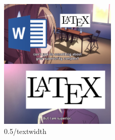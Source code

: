 \documentclass[12pt]{article}
\begin{document}
	\begin{figure}
		\centering
		\includegraphics[width=0.5\textwidth]{meme_superior.png}
		\caption{0.5\slash textwidth}

	\end{figure}
\end{document}
